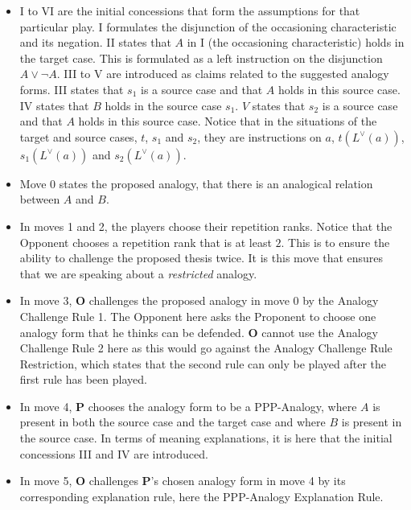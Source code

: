 			\begin{itemize}
				\item I to VI are the initial concessions that form the assumptions for that particular play. I formulates the disjunction of the occasioning characteristic and its negation. II states that $A$ in I (the occasioning characteristic) holds in the target case. This is formulated as a left instruction on the disjunction $A \lor \neg A$. III to V are introduced as claims related to the suggested analogy forms. III states that $s_1$ is a source case and that $A$ holds in this source case. IV states that $B$ holds in the source case $s_1$. $V$ states that $s_2$ is a source case and that $A$ holds in this source case. Notice that in the situations of the target and source cases, $t$, $s_1$ and $s_2$, they are instructions on $a$, $t(L^\lor (a))$, $s_1(L^\lor (a))$ and $s_2(L^\lor (a))$.
				\item Move 0 states the proposed analogy, that there is an analogical relation between $A$ and $B$. 
				\item In moves 1 and 2, the players choose their repetition ranks. Notice that the Opponent chooses a repetition rank that is at least $2$. This is to ensure the ability to challenge the proposed thesis twice. It is this move that ensures that we are speaking about a \textit{restricted} analogy.
				\item In move 3, \textbf{O} challenges the proposed analogy in move 0 by the Analogy Challenge Rule 1. The Opponent here asks the Proponent to choose one analogy form that he thinks can be defended. \textbf{O} cannot use the Analogy Challenge Rule 2 here as this would go against the Analogy Challenge Rule Restriction, which states that the second rule can only be played after the first rule has been played.
				\item In move 4, \textbf{P} chooses the analogy form to be a PPP-Analogy, where $A$ is present in both the source case and the target case and where $B$ is present in the source case. In terms of meaning explanations, it is here that the initial concessions III and IV are introduced. 
				\item In move 5, \textbf{O} challenges \textbf{P}'s chosen analogy form in move 4 by its corresponding explanation rule, here the PPP-Analogy Explanation Rule. 

\end{itemize}

